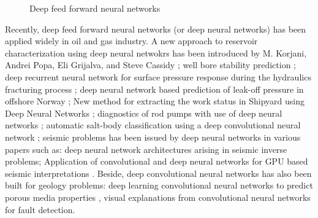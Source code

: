 \documentclass[12pt,a4paper]{report}
\def\layersep{2.5cm}
\begin{document}
\begin{figure}[H]
\caption{Deep feed forward neural networks}
\end{figure}
Recently, deep feed forward neural networks (or deep neural networks) has been applied widely in oil and gas industry. A new approach to reservoir characterization using deep neural netwokrs has been introduced by M. Korjani, Andrei Popa, Eli Grijalva, and Steve Cassidy \cite{example1}; well bore stability prediction \cite{example2}; deep recurrent neural network for surface pressure response during the hydraulics fracturing process \cite{example3}; deep neural network based prediction of leak-off pressure in offshore Norway \cite{example4}; New method for extracting the work status in Shipyard using Deep Neural Networks \cite{example5}; diagnostics of rod pumps with use of deep neural networks \cite{example7}; automatic salt-body classification using a deep convolutional neural network \cite{example8}; seismic problems has been issued by deep neural networks in various papers such as: deep neural network architectures arising in seismic inverse problems\cite{example6}; Application of convolutional and deep neural networks for GPU based seismic interpretations \cite{example9}. Beside, deep convolutional neural networks has also been built for geology problems: deep learning convolutional neural networks to predict porous media properties \cite{example10}, visual explanations from convolutional neural networks for fault detection\cite{example11}.

\end{document}

